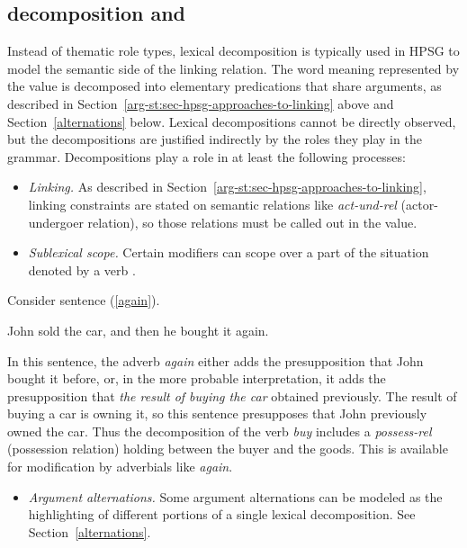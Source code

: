 \documentclass[output=paper,biblatex,babelshorthands,newtxmath,draftmode,colorlinks, citecolor=brown]{langscibook}
\begin{document}
\subsection{\content decomposition and \argst}

%
Instead of thematic role types, lexical decomposition is typically used in HPSG to model the
semantic side of the linking relation.  The word meaning represented by the \content value is
decomposed into elementary predications that share arguments, as described in
Section~\ref{arg-st:sec-hpsg-approaches-to-linking} above and Section~\ref{alternations} below.
Lexical decompositions cannot be directly observed, but the decompositions are justified indirectly
by the roles they play in the grammar.  Decompositions play a role in at least the following
processes:

\begin{itemize}
\item  \textit{Linking.}  As described in Section~\ref{arg-st:sec-hpsg-approaches-to-linking}, linking constraints are stated on semantic relations like \textit{act-und-rel} (actor-undergoer relation), so those relations must be called out in the \content value.
\item \textit{Sublexical scope.}  Certain modifiers can scope over a part of the situation denoted by a verb \citep{Dowty:1979a}.  
\end{itemize}

\largerpage
\noindent
Consider sentence (\ref{again}).

\begin{exe}
\ex \label{again} John sold the car, and then he bought it again.
\end{exe}

\noindent
In this sentence, the adverb \textit{again} either adds the presupposition that John bought it before, or, in the more probable interpretation, it adds the presupposition that \textit{the result of buying the car} obtained previously.  The result of buying a car is owning it, so this sentence presupposes that John previously owned the car. Thus the decomposition of the verb \textit{buy} includes a \textit{possess-rel} (possession relation) holding between the buyer and the goods.  This is available for modification by adverbials like \textit{again}.

\begin{itemize}
\item \textit{Argument alternations.}  Some argument alternations can be modeled as the highlighting of different portions of a single lexical decomposition.  See Section~\ref{alternations}.
\end{itemize}  
\end{document}
